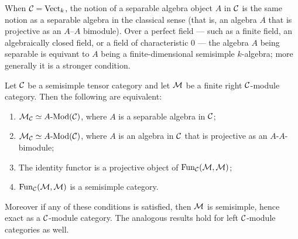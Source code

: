 \documentclass{amsart}
\begin{document}
\begin{remark}
	When $\mathcal C = \mathrm{Vect}_k$, the notion of a separable algebra object $A$ in $\mathcal C$ is the same notion as a separable algebra in the classical sense (that is, an algebra $A$ that is projective as an $A$--$A$ bimodule). Over a perfect field --- such as a finite field, an algebraically closed field, or a field of characteristic $0$ --- the algebra $A$ being separable is equivant to $A$ being a finite-dimensional semisimple $k$-algebra; more generally it is a stronger condition. 
\end{remark}

\begin{theorem} \label{thm:SepModCats}
	Let $\mathcal C$ be a  semisimple tensor category and let $\mathcal M$ be a finite right $\mathcal C$-module category. Then the following are equivalent:
	\begin{enumerate}
		\item $\cM_\cC \simeq \Mod{A}{}(\cC)$, where $A$ is a separable algebra in $\mathcal C$;
		\item $\cM_\cC \simeq \Mod{A}{}(\cC)$, where $A$ is an algebra in $\mathcal C$ that is projective as an $A$-$A$-bimodule;
		\item The identity functor is a projective object of $\operatorname{Fun}_\mathcal C(\mathcal M, \mathcal M)$;
		\item $\operatorname{Fun}_\mathcal C(\mathcal M, \mathcal M)$ is a semisimple category. 
	\end{enumerate}
	Moreover if any of these conditions is satisfied, then $\mathcal M$ is semisimple, hence exact as a $\mathcal C$-module category. The analogous results hold for left $\mathcal C$-module categories as well. 
\end{theorem}
\end{document}

